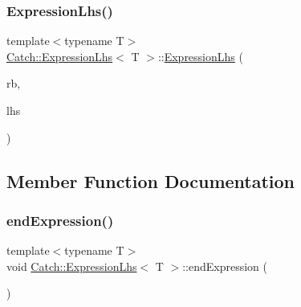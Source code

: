 \subsubsection{\texorpdfstring{Expression\+Lhs()}{ExpressionLhs()}}
{\footnotesize\ttfamily template$<$typename T$>$ \\
\mbox{\hyperlink{class_catch_1_1_expression_lhs}{Catch\+::\+Expression\+Lhs}}$<$ T $>$\+::\mbox{\hyperlink{class_catch_1_1_expression_lhs}{Expression\+Lhs}} (\begin{DoxyParamCaption}\item[{\mbox{\hyperlink{class_catch_1_1_result_builder}{Result\+Builder}} \&}]{rb,  }\item[{T}]{lhs }\end{DoxyParamCaption})\hspace{0.3cm}{\ttfamily [inline]}}



\subsection{Member Function Documentation}
\mbox{\label{class_catch_1_1_expression_lhs_a13d2551a927790284fb5ddf1ee2c9079}} 
\subsubsection{\texorpdfstring{end\+Expression()}{endExpression()}}
{\footnotesize\ttfamily template$<$typename T$>$ \\
void \mbox{\hyperlink{class_catch_1_1_expression_lhs}{Catch\+::\+Expression\+Lhs}}$<$ T $>$\+::end\+Expression (\begin{DoxyParamCaption}{ }\end{DoxyParamCaption})\hspace{0.3cm}{\ttfamily [inline]}}

\mbox{\label{class_catch_1_1_expression_lhs_a3bc08bb2b9c27678e2628faa73645144}} 
